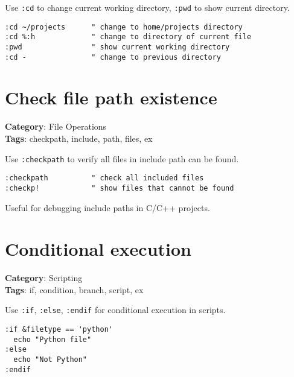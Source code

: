 {{{{{{Use {\footnotesize \Verb§:cd§} to change current working directory, {\footnotesize \Verb§:pwd§} to show current directory.

\begin{Exa*}{}
\begin{Verbatim}[fontsize=\footnotesize, breaklines, breakanywhere]
:cd ~/projects      " change to home/projects directory
:cd %:h             " change to directory of current file
:pwd                " show current working directory
:cd -               " change to previous directory
\end{Verbatim}
\end{Exa*}

\section{Check file path existence}

\textbf{Category}: File Operations\\ \textbf{Tags}: checkpath, include, path, files, ex
\vspace{0.5cm}

Use {\footnotesize \Verb§:checkpath§} to verify all files in include path can be found.

\begin{Exa*}{}
\begin{Verbatim}[fontsize=\footnotesize, breaklines, breakanywhere]
:checkpath          " check all included files
:checkp!            " show files that cannot be found
\end{Verbatim}
\end{Exa*}

Useful for debugging include paths in C/C++ projects.

\section{Conditional execution}

\textbf{Category}: Scripting\\ \textbf{Tags}: if, condition, branch, script, ex
\vspace{0.5cm}

Use {\footnotesize \Verb§:if§}, {\footnotesize \Verb§:else§}, {\footnotesize \Verb§:endif§} for conditional execution in scripts.

\begin{Exa*}{}
\begin{Verbatim}[fontsize=\footnotesize, breaklines, breakanywhere]
:if &filetype == 'python'
  echo "Python file"
:else
  echo "Not Python"
:endif
\end{Verbatim}
\end{Exa*}

}}}}}}
